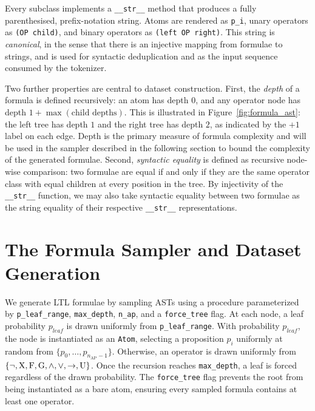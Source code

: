 \documentclass[titlepage,a4paper,11pt]{report}
\begin{document}
    Every subclass implements a \texttt{\_\_str\_\_} method that produces a fully parenthesised, prefix-notation string. Atoms are rendered as \texttt{p\_i}, unary operators as \texttt{(OP child)}, and binary operators as \texttt{(left OP right)}. This string is  \emph{canonical}, in the sense that there is an injective mapping from formulae to strings, and is used for syntactic deduplication and as the input sequence consumed by the tokenizer.

    Two further properties are central to dataset construction. First, the \emph{depth} of a formula is defined recursively: an atom has depth $0$, and any operator node has depth $1 + \max(\text{child depths})$. This is illustrated in Figure~\ref{fig:formula_ast}: the left tree has depth $1$ and the right tree has depth $2$, as indicated by the $+1$ label on each edge. Depth is the primary measure of formula complexity and will be used in the sampler described in the following section to bound the complexity of the generated formulae. Second, \emph{syntactic equality} is defined as recursive node-wise comparison: two formulae are equal if and only if they are the same operator class with equal children at every position in the tree. By injectivity of the \texttt{\_\_str\_\_} function, we may also take syntactic equality between two formulae as the string equality of their respective \texttt{\_\_str\_\_} representations.
    
    \section{The Formula Sampler and Dataset Generation}\label{sec:formula_sampler}

    We generate LTL formulae by sampling ASTs using a procedure parameterized by \texttt{p\_leaf\_range}, \texttt{max\_depth}, \texttt{n\_ap}, and a \texttt{force\_tree} flag. At each node, a leaf probability $p_{leaf}$ is drawn uniformly from \texttt{p\_leaf\_range}. With probability $p_{leaf}$, the node is instantiated as an \texttt{Atom}, selecting a proposition $p_i$ uniformly at random from $\{p_0, \ldots, p_{n_{\text{AP}}-1}\}$. Otherwise, an operator is drawn uniformly from $\{\neg, \text{X}, \text{F}, \text{G}, \land, \lor, \to, \text{U} \}$. Once the recursion reaches \texttt{max\_depth}, a leaf is forced regardless of the drawn probability. The \texttt{force\_tree} flag prevents the root from being instantiated as a bare atom, ensuring every sampled formula contains at least one operator.
\end{document}
